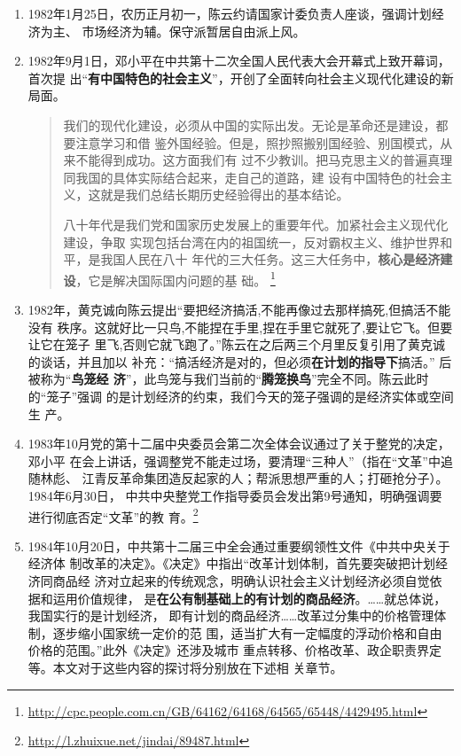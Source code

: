 \begin{enumerate}
\item 1982年1月25日，农历正月初一，陈云约请国家计委负责人座谈，强调计划经济为主、
  市场经济为辅。保守派暂居自由派上风。

\item 1982年9月1日，邓小平在中共第十二次全国人民代表大会开幕式上致开幕词，首次提
  出“\textbf{有中国特色的社会主义}”，开创了全面转向社会主义现代化建设的新局面。
  \begin{quotation}
    我们的现代化建设，必须从中国的实际出发。无论是革命还是建设，都要注意学习和借
    鉴外国经验。但是，照抄照搬别国经验、别国模式，从来不能得到成功。这方面我们有
    过不少教训。把马克思主义的普遍真理同我国的具体实际结合起来，走自己的道路，建
    设有中国特色的社会主义，这就是我们总结长期历史经验得出的基本结论。

    八十年代是我们党和国家历史发展上的重要年代。加紧社会主义现代化建设，争取
    实现包括台湾在内的祖国统一，反对霸权主义、维护世界和平，是我国人民在八十
    年代的三大任务。这三大任务中，\textbf{核心是经济建设}，它是解决国际国内问题的基
    础。
    \footnote{\url{http://cpc.people.com.cn/GB/64162/64168/64565/65448/4429495.html}}
  \end{quotation}

\item 1982年，黄克诚向陈云提出“要把经济搞活,不能再像过去那样搞死,但搞活不能没有
  秩序。这就好比一只鸟,不能捏在手里,捏在手里它就死了,要让它飞。但要让它在笼子
  里飞,否则它就飞跑了。”陈云在之后两三个月里反复引用了黄克诚的谈话，并且加以
  补充：“搞活经济是对的，但必须\textbf{在计划的指导下}搞活。” 后被称为“\textbf{鸟笼经
    济}”\cite{chenyunjihua}，此鸟笼与我们当前的“\textbf{腾笼换鸟}”完全不同。陈云此时的“笼子”强调
  的是计划经济的约束，我们今天的笼子强调的是经济实体或空间生
  产。

\item 1983年10月党的第十二届中央委员会第二次全体会议通过了关于整党的决定，邓小平
  在会上讲话，强调整党不能走过场，要清理“三种人”（指在“文革”中追随林彪、
  江青反革命集团造反起家的人；帮派思想严重的人；打砸抢分子）。1984年6月30日，
  中共中央整党工作指导委员会发出第9号通知，明确强调要进行彻底否定“文革”的教
  育。\footnote{\url{http://l.zhuixue.net/jindai/89487.html}}

\item 1984年10月20日，中共第十二届三中全会通过重要纲领性文件《中共中央关于经济体
  制改革的决定》。《决定》中指出“改革计划体制，首先要突破把计划经济同商品经
  济对立起来的传统观念，明确认识社会主义计划经济必须自觉依据和运用价值规律，
  是\textbf{在公有制基础上的有计划的商品经济}。……就总体说，我国实行的是计划经济，
  即有计划的商品经济……改革过分集中的价格管理体制，逐步缩小国家统一定价的范
  围，适当扩大有一定幅度的浮动价格和自由价格的范围。”此外《决定》还涉及城市
  重点转移、价格改革、政企职责界定等。本文对于这些内容的探讨将分别放在下述相
  关章节。


\end{enumerate}

